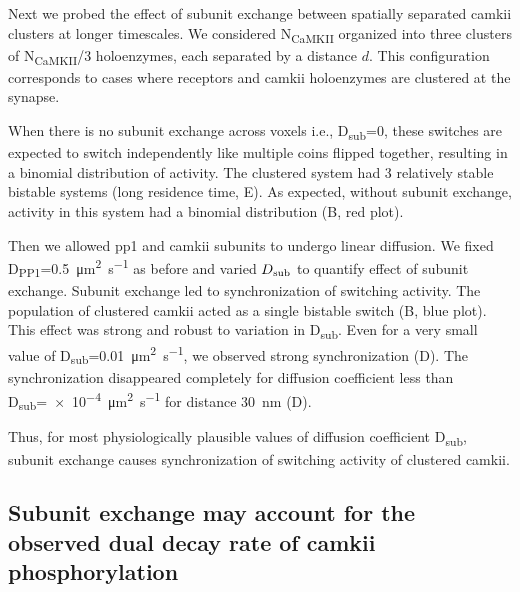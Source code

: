 \documentclass[9pt,lineno,doublespacing]{elife}
\newcommand\SUB[2]{#1\textsubscript{#2}}
\begin{document}
Next we probed the effect of subunit exchange between spatially separated
\gls{camkii} clusters at longer timescales. We considered \SUB{N}{CaMKII}
organized into three clusters of \SUB{N}{CaMKII}/3 holoenzymes, each separated
by a distance \(d\). This configuration corresponds to cases where receptors and
\gls{camkii} holoenzymes are clustered at the synapse. 

When there is no subunit exchange across voxels i.e., \SUB{D}{sub}=0, these
switches are expected to switch independently like multiple coins flipped
together, resulting in a binomial distribution of activity. The clustered system
had 3 relatively stable bistable systems (long residence time,
E). As expected, without subunit exchange, activity in
this system had a binomial distribution (B, red plot). 

Then we allowed \gls{pp1} and \gls{camkii} subunits to undergo linear diffusion.
We fixed \SUB{D}{PP1}=\SI{0.5}{\micro\meter\squared\per\second} as before and varied
$\SUB{D}{sub}$ to quantify effect of subunit exchange.  Subunit exchange led to
synchronization of switching activity. The population of clustered \gls{camkii}
acted as a single bistable switch (B, blue plot).
This effect was strong and robust to variation in \SUB{D}{sub}. Even for a very
small value of \SUB{D}{sub}=\SI{0.01}{\micro\meter\squared\per\second}, we observed
strong synchronization (D). The synchronization
disappeared completely for diffusion coefficient less than
\SUB{D}{sub}=\SI{e-4}{\micro\meter\squared\per\second} for distance
\SI{30}{\nano\meter} (D).

Thus, for most physiologically plausible values of diffusion coefficient
\SUB{D}{sub}, subunit exchange causes synchronization of switching activity of
clustered \gls{camkii}.

\subsection{Subunit exchange may account for the observed dual decay rate of
\gls{camkii} phosphorylation}\label{subsec:camkii_decay_two_time_course}
\end{document}
